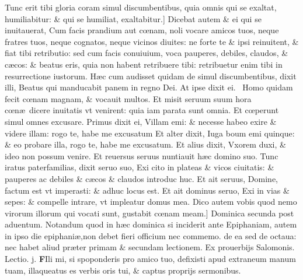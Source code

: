 \documentclass[a5paper,10pt]{book}
\def\leftmarginnote{%
	\lrmarginnote{\hskip -\marginparsep \hskip -6.5em}}
\def\rightmarginnote{%
	\lrmarginnote{\hskip\columnwidth \hskip -1em}}
\def\ae{æ}
\def\oe{œ}
\begin{document}
\begin{multicols*}{2}
Tunc erit tibi gloria coram simul discumbentibus, quia omnis qui se exaltat, humiliabitur: \& qui se humiliat, exaltabitur.]
Dicebat\rightmarginnote{B} autem \& ei qui se inuitauerat, Cum facis prandium aut c\oe nam, noli vocare amicos tuos, neque fratres tuos, neque cognatos, neque vicinos diuites: ne forte te \& ipsi reinuitent, \& fiat tibi retributio: sed cum facis conuiuium, voca pauperes, debiles, claudos, \& c\ae cos: \& beatus eris, quia non habent retribuere tibi: retribuetur enim tibi in resurrectione iustorum.
H\ae c cum audisset quidam de simul discumbentibus, dixit illi, Beatus qui manducabit panem in regno Dei.
At ipse dixit ei. \textdagger \ 
Homo\leftmarginnote{\begin{flushright}C\end{flushright}} quidam fecit c\oe nam magnam, \& vocauit multos.
Et misit seruum suum hora c\oe n\ae \ dicere inuitatis vt venirent: quia iam parata sunt omnia. Et c\oe perunt simul omnes excusare.
Primus dixit ei, Villam emi: \& necesse habeo exire \& videre illam: rogo te, habe me excusatum Et alter dixit, Iuga boum emi quinque: \& eo probare illa, rogo te, habe me excusatum.
Et alius dixit, Vxorem duxi, \& ideo non possum venire. Et reuersus seruus nuntiauit h\ae c domino suo.
Tunc iratus paterfamilias, dixit seruo suo, Exi cito in plateas \& vicos ciuitatis: \& pauperes ac debiles \& c\ae cos \& claudos introduc huc.
Et ait seruus, Domine, factum est vt imperasti: \& adhuc locus est. Et ait dominus seruo, Exi in vias \& sepes: \& compelle intrare, vt impleatur domus mea.
Dico autem vobis quod nemo virorum illorum qui vocati sunt, gustabit c\oe nam meam.]
\newline \textswab{C} \color{red} \hypertarget{SUN-SECVNDA-POST-ADV}{Dominica secunda post aduentum.}\color{black}
\bookmark[rellevel=-1,dest=SUN-SECVNDA-POST-ADV]{DOMINICA II POST ADVENTVM}
\newline \color{red} Notandum quod in h\ae c dominica si inciderit ante Epiphaniam, autem in ipso die epiphani\ae ,non debet fieri officium nec commemo. de ea sed de octaua: nec habet aliud pr\ae ter primam \& secundam lectionem. \color{black}
\newline \color{red} Ex prouerbijs Salomonis. \hfill Lectio. j. \color{black}
\vspace{-1.25em}
\lettrine[lines=2]{\bfseries F}{}Ili\leftmarginnote{\begin{flushright}ca. 6.\end{flushright}} mi, si spoponderis pro amico tuo, defixisti apud extraneum manum tuam, illaqueatus es verbis oris tui, \& captus proprijs sermonibus.

\end{multicols*}
\end{document}
